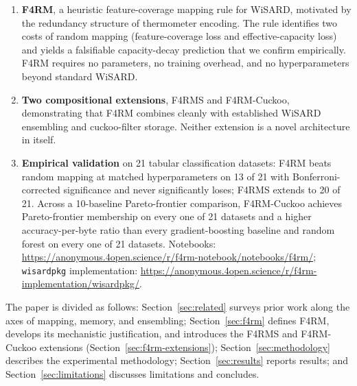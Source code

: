 \begin{enumerate}
\item \textbf{F4RM}, a heuristic feature-coverage mapping rule for WiSARD, motivated by the redundancy structure of thermometer encoding. The rule identifies two costs of random mapping (feature-coverage loss and effective-capacity loss) and yields a falsifiable capacity-decay prediction that we confirm empirically. F4RM requires no parameters, no training overhead, and no hyperparameters beyond standard WiSARD.

\item \textbf{Two compositional extensions}, F4RMS and F4RM-Cuckoo, demonstrating that F4RM combines cleanly with established WiSARD ensembling and cuckoo-filter storage. Neither extension is a novel architecture in itself.

\item \textbf{Empirical validation} on 21 tabular classification datasets: F4RM beats random mapping at matched hyperparameters on 13 of 21 with Bonferroni-corrected significance and never significantly loses; F4RMS extends to 20 of 21. Across a 10-baseline Pareto-frontier comparison, F4RM-Cuckoo achieves Pareto-frontier membership on every one of 21 datasets and a higher accuracy-per-byte ratio than every gradient-boosting baseline and random forest on every one of 21 datasets. Notebooks: \url{https://anonymous.4open.science/r/f4rm-notebook/notebooks/f4rm/}; \texttt{wisardpkg} implementation: \url{https://anonymous.4open.science/r/f4rm-implementation/wisardpkg/}.
\end{enumerate}

The paper is divided as follows: Section~\ref{sec:related} surveys prior work along the axes of mapping, memory, and ensembling; Section~\ref{sec:f4rm} defines F4RM, develops its mechanistic justification, and introduces the F4RMS and F4RM-Cuckoo extensions (Section~\ref{sec:f4rm-extensions}); Section~\ref{sec:methodology} describes the experimental methodology; Section~\ref{sec:results} reports results; and Section~\ref{sec:limitations} discusses limitations and concludes.
